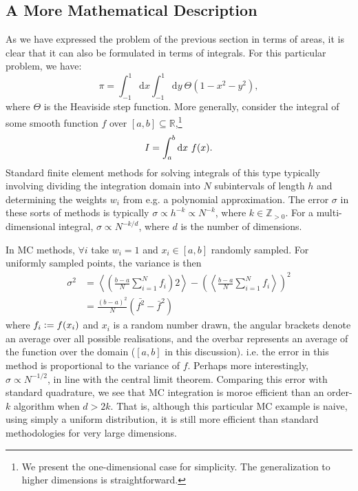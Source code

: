 \subsection{A More Mathematical Description}

As we have expressed the problem of the previous section in terms of areas, it is clear that it can also be formulated in terms of integrals. For this particular problem, we have:
\begin{equation}
    \pi = \int_{-1}^1  \mathrm{d}x \int_{-1}^1 \mathrm{d}y\ \Theta(1-x^2-y^2) ,
\end{equation}
where $\Theta$ is the Heaviside step function.
More generally, consider the integral of some smooth function $f$ over $[a,b]\subseteq \mathbb{R}$,\footnote{We present the one-dimensional case for simplicity. The generalization to higher dimensions is straightforward.}
\begin{equation}
    I = \int_a^b \mathrm{d} x \ f(x).
\end{equation}
Standard finite element methods for solving integrals of this type typically involving dividing the integration domain into $N$ subintervals of length $h$ and determining the weights $w_i$ from e.g. a polynomial approximation. The error $\sigma$ in these sorts of methods is typically $\sigma\propto h^{-k} \propto N^{-k}$, where $k\in\mathbb{Z}_{>0}$. For a multi-dimensional integral, $\sigma\propto N^{-k/d}$, where $d$ is the number of dimensions.\cite{ascherFirst2011}

In \gls{MC} methods, $\forall i$ take $w_i=1$ and $x_i\in[a,b]$ randomly sampled. For uniformly sampled points, the variance is then
\begin{align}
    \sigma^2 &= \left\langle \left( \frac{b-a}{N}\sum^N_{i=1}f_i\right)2\right\rangle - \left( \left\langle  \frac{b-a}{N}\sum^N_{i=1}f_i\right\rangle\right)^2 \\
    &= \frac{(b-a)^2}{N}(\bar{f^2} - \bar f^2)
\end{align}
where $f_i\mathrel{\mathop:}= f(x_i)$ and $x_i$ is a random number drawn, the angular brackets denote an average over all possible realisations, and the overbar represents an average of the function over the domain ($[a,b]$ in this discussion). i.e. the error in this method is proportional to the variance of $f$. Perhaps more interestingly, $\sigma\propto N^{-1/2}$, in line with the central limit theorem. Comparing this error with standard quadrature, we see that MC integration is moroe efficient than an order-$k$ algorithm when $d>2k$. That is, although this particular \gls{MC} example is naive, using simply a uniform distribution, it is still more efficient than standard methodologies for very large dimensions.

